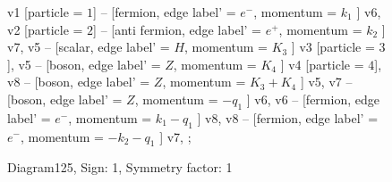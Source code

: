 \documentclass{revtex4}
\begin{document}
\begin{figure}[!htb]
\begin{center}
{    %
v1 [particle = \(1\)] -- [fermion, edge label' = \(e^{-}\), momentum = \(k_{1}\) ] v6, 
v2 [particle = \(2\)] -- [anti fermion, edge label' = \(e^{+}\), momentum = \(k_{2}\) ] v7, 
v5 -- [scalar, edge label' = \(H\), momentum = \(K_{3}\) ] v3 [particle = \(3\)], 
v5 -- [boson, edge label' = \(Z\), momentum = \(K_{4}\) ] v4 [particle = \(4\)], 
v8 -- [boson, edge label' = \(Z\), momentum = \(K_{3} + K_{4}\) ] v5, 
v7 -- [boson, edge label' = \(Z\), momentum = \(-q_{1}\) ] v6, 
v6 -- [fermion, edge label' = \(e^{-}\), momentum = \(k_{1} - q_{1}\) ] v8, 
v8 -- [fermion, edge label' = \(e^{-}\), momentum = \(-k_{2} - q_{1}\) ] v7, 
};
\end{center}
\caption{Diagram125, Sign: 1, Symmetry factor: 1}
\end{figure}
\newpage
\end{document}
